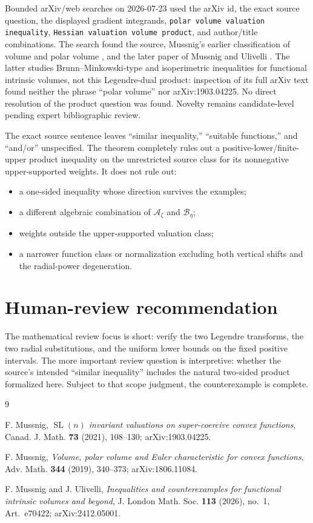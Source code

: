 \documentclass[11pt]{amsart}
\theoremstyle{remark}
\newcommand{\A}{\mathcal A}
\newcommand{\B}{\mathcal B}
\begin{document}
Bounded arXiv/web searches on 2026-07-23 used the arXiv id, the exact source
question, the displayed gradient integrands, \texttt{polar volume valuation
inequality}, \texttt{Hessian valuation volume product}, and author/title
combinations.  The search found the source, Mussnig's earlier classification
of volume and polar volume \cite{Mussnig2018}, and the later paper of Mussnig
and Ulivelli \cite{MussnigUlivelli2024}.  The latter studies
Brunn--Minkowski-type and isoperimetric inequalities for functional intrinsic
volumes, not this Legendre-dual product: inspection of its full arXiv text
found neither the phrase ``polar volume'' nor arXiv:1903.04225.  No direct
resolution of the product question was found.  Novelty remains candidate-level
pending expert bibliographic review.

The exact source sentence leaves ``similar inequality,'' ``suitable
functions,'' and ``and/or'' unspecified.  The theorem completely rules out a
positive-lower/finite-upper product inequality on the unrestricted source
class for its nonnegative upper-supported weights.  It does not rule out:
\begin{itemize}
\item a one-sided inequality whose direction survives the examples;
\item a different algebraic combination of $\A_\zeta$ and $\B_\eta$;
\item weights outside the upper-supported valuation class;
\item a narrower function class or normalization excluding both vertical
      shifts and the radial-power degeneration.
\end{itemize}

\section*{Human-review recommendation}

The mathematical review focus is short: verify the two Legendre transforms,
the two radial substitutions, and the uniform lower bounds on the fixed
positive intervals.  The more important review question is interpretive:
whether the source's intended ``similar inequality'' includes the natural
two-sided product formalized here.  Subject to that scope judgment, the
counterexample is complete.

\begin{thebibliography}{9}

F. Mussnig,
\emph{$\operatorname{SL}(n)$ invariant valuations on super-coercive convex
functions},
Canad. J. Math. \textbf{73} (2021), 108--130;
arXiv:1903.04225.

F. Mussnig,
\emph{Volume, polar volume and Euler characteristic for convex functions},
Adv. Math. \textbf{344} (2019), 340--373;
arXiv:1806.11084.

F. Mussnig and J. Ulivelli,
\emph{Inequalities and counterexamples for functional intrinsic volumes and
beyond},
J. London Math. Soc. \textbf{113} (2026), no.~1, Art.~e70422;
arXiv:2412.05001.

\end{thebibliography}
\end{document}
